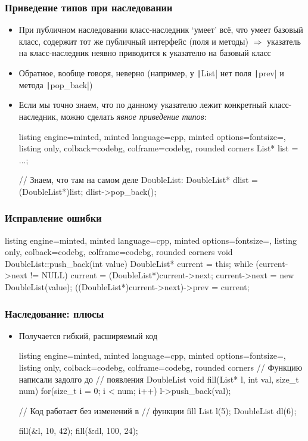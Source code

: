 \documentclass[10pt]{beamer}
\begin{document}
\begin{frame}[fragile]
\frametitle{Приведение типов при наследовании}
\begin{itemize}
\item При публичном наследовании класс-наследник `умеет' всё, что умеет базовый класс, содержит тот же публичный интерфейс (поля и методы) \pause \(\Longrightarrow\) указатель на класс-наследник неявно приводится к указателю на базовый класс
\pause
\item Обратное, вообще говоря, неверно (например, у \texttt|List| нет поля \texttt|prev| и метода \texttt|pop_back|)
\pause
\item Если мы точно знаем, что по данному указателю лежит конкретный класс-наследник, можно сделать \textit{явное приведение типов}:
\begin{tcblisting}{listing engine=minted, minted language=cpp, minted options={fontsize=\scriptsize}, listing only, colback=codebg, colframe=codebg, rounded corners}
List* list = ...;

// Знаем, что там на самом деле DoubleList:
DoubleList* dlist = (DoubleList*)list;
dlist->pop_back();
\end{tcblisting}
\end{itemize}
\end{frame}

\begin{frame}[fragile]
\frametitle{Исправление ошибки}
\begin{itemize}
\begin{tcblisting}{listing engine=minted, minted language=cpp, minted options={fontsize=\scriptsize}, listing only, colback=codebg, colframe=codebg, rounded corners}
void DoubleList::push_back(int value) {
  DoubleList* current = this;
  while (current->next != NULL)
    current = (DoubleList*)current->next;
  current->next = new DoubleList(value);
  ((DoubleList*)current->next)->prev = current;
}
\end{tcblisting}
\end{itemize}
\end{frame}

\begin{frame}[fragile]
\frametitle{Наследование: плюсы}
\begin{itemize}
\item Получается гибкий, расширяемый код
\begin{tcblisting}{listing engine=minted, minted language=cpp, minted options={fontsize=\scriptsize}, listing only, colback=codebg, colframe=codebg, rounded corners}
// Функцию написали задолго до
// появления DoubleList
void fill(List* l, int val, size_t num) {
  for(size_t i = 0; i < num; i++)
    l->push_back(val);
}

// Код работает без изменений в
// функции fill
List l(5);
DoubleList dl(6);

fill(&l, 10, 42);
fill(&dl, 100, 24);
\end{tcblisting}
\end{itemize}
\end{frame}
\end{document}
